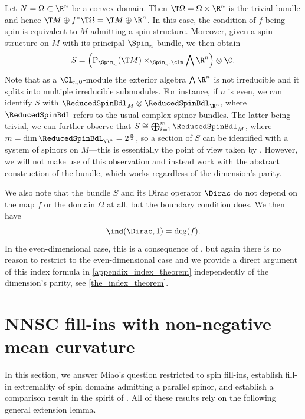 \documentclass[a4paper,11pt]{amsart}
\numberwithin{equation}{section}
\begin{document}
\begin{example}\label{example:domain}
    Let \(N = \Omega \subset \R^n\) be a convex domain.
    Then \(\T \Omega = \Omega \times \R^n\) is the trivial bundle and hence \(\T M \oplus f^\ast \T \Omega = \T M \oplus \R^n\).
    In this case, the condition of \(f\) being spin is equivalent to \(M\) admitting a spin structure.
    Moreover, given a spin structure on \(M\) with its principal \(\Spin_n\)-bundle, we then obtain
    \[
      S = \left( \mathrm{P}_{\Spin_n}(\T M) \times_{\Spin_n, \clm} \bigwedge \R^n \right) \otimes \C.
    \]
    Note that as a \(\Cl_{n,0}\)-module the exterior algebra \(\bigwedge \R^n\) is not irreducible and it splits into multiple irreducible submodules.
    For instance, if \(n\) is even, we can identify \(S\) with \(\ReducedSpinBdl_M \otimes \ReducedSpinBdl_{\R^n}\), where \(\ReducedSpinBdl\) refers to the usual complex spinor bundles.
    The latter being trivial, we can further observe that \(S \cong \bigoplus_{i=1}^m \ReducedSpinBdl_M\), where $m = \dim \ReducedSpinBdl_{\R^n} = 2^{\frac{n}{2}}$, so a section of \(S\) can be identified with a system of spinors on \(M\)---this is essentially the point of view taken by \textcite{brendle2024scalar}.
    However, we will not make use of this observation and instead work with the abstract construction of the bundle, which works regardless of the dimension's parity.
    
    We also note that the bundle \(S\) and its Dirac operator \(\Dirac\) do not depend on the map \(f\) or the domain \(\Omega\) at all, but the boundary condition  does.
    We then have 
    \[\ind(\Dirac, 1) = \deg(f).\]
    In the even-dimensional case, this is a consequence of \textcite{Lott}, but again there is no reason to restrict to the even-dimensional case and we provide a direct argument of this index formula in \cref{appendix_index_theorem} independently of the dimension's parity, see \cref{the_index_theorem}.
\end{example}

 


\section{NNSC fill-ins with non-negative mean curvature}
\label{sec:nnsc_fillin_positive_mean}

In this section, we answer Miao's question \cite[Question 2]{miao2021nonexistence} restricted to spin fill-ins, establish fill-in extremality of spin domains admitting a parallel spinor, and establish a comparison result in the spirit of \textcite{Lott}.
All of these results rely on the following general extension lemma. 
\end{document}
